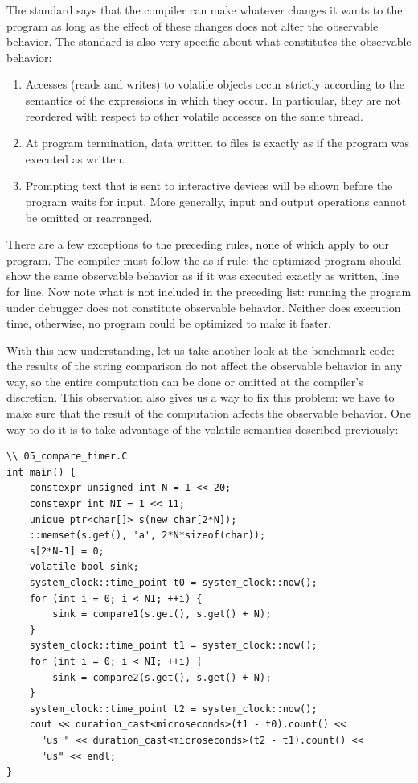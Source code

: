The standard says that the compiler can make whatever changes it wants to the program as long as the effect of these changes does not alter the observable behavior. The standard is also very specific about what constitutes the observable behavior:

\begin{enumerate}
\item Accesses (reads and writes) to volatile objects occur strictly according to the semantics of the expressions in which they occur. In particular, they are not reordered with respect to other volatile accesses on the same thread.
\item At program termination, data written to files is exactly as if the program was executed as written.
\item Prompting text that is sent to interactive devices will be shown before the program waits for input. More generally, input and output operations cannot be omitted or rearranged.
\end{enumerate}

There are a few exceptions to the preceding rules, none of which apply to our program. The compiler must follow the as-if rule: the optimized program should show the same observable behavior as if it was executed exactly as written, line for line. Now note what is not included in the preceding list: running the program under debugger does not constitute observable behavior. Neither does execution time, otherwise, no program could be optimized to make it faster.

With this new understanding, let us take another look at the benchmark code: the results of the string comparison do not affect the observable behavior in any way, so the entire computation can be done or omitted at the compiler's discretion. This observation also gives us a way to fix this problem: we have to make sure that the result of the computation affects the observable behavior. One way to do it is to take advantage of the volatile semantics described previously:

\begin{lstlisting}[style=styleCXX]
\\ 05_compare_timer.C
int main() {
	constexpr unsigned int N = 1 << 20;
	constexpr int NI = 1 << 11;
	unique_ptr<char[]> s(new char[2*N]);
	::memset(s.get(), 'a', 2*N*sizeof(char));
	s[2*N-1] = 0;
	volatile bool sink;
	system_clock::time_point t0 = system_clock::now();
	for (int i = 0; i < NI; ++i) {
		sink = compare1(s.get(), s.get() + N);
	}
	system_clock::time_point t1 = system_clock::now();
	for (int i = 0; i < NI; ++i) {
		sink = compare2(s.get(), s.get() + N);
	}
	system_clock::time_point t2 = system_clock::now();
	cout << duration_cast<microseconds>(t1 - t0).count() <<
	  "us " << duration_cast<microseconds>(t2 - t1).count() <<
	  "us" << endl;
}
\end{lstlisting}

